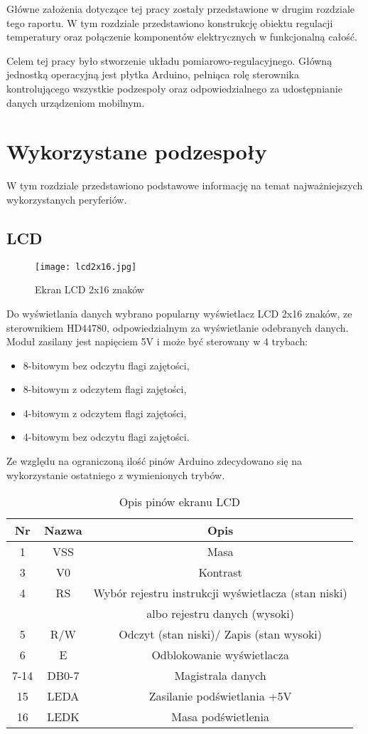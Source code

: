 Główne założenia dotyczące tej pracy zostały przedstawione w drugim rozdziale tego raportu. W tym rozdziale przedstawiono konstrukcję obiektu regulacji temperatury oraz połączenie komponentów elektrycznych w funkcjonalną całość.

Celem tej pracy było stworzenie układu pomiarowo-regulacyjnego. Główną jednostką operacyjną jest płytka Arduino, pełniąca rolę sterownika kontrolującego wszystkie podzespoły oraz odpowiedzialnego za udostępnianie danych urządzeniom mobilnym.


\section{Wykorzystane podzespoły} 
W tym rozdziale przedstawiono podstawowe informację na temat najważniejszych wykorzystanych peryferiów.
\subsection{LCD}%
\begin{figure}[H]
	\centering
	\texttt{[image: lcd2x16.jpg]}
	\caption{Ekran LCD 2x16 znaków}
\end{figure}
Do wyświetlania danych wybrano popularny wyświetlacz LCD 2x16 znaków, ze sterownikiem HD44780, odpowiedzialnym za wyświetlanie odebranych danych. Moduł zasilany jest napięciem 5V i może być sterowany w 4 trybach:
\begin{itemize}
\item 8-bitowym bez odczytu flagi zajętości,
\item 8-bitowym z odczytem flagi zajętości,
\item 4-bitowym z odczytem flagi zajętości,
\item 4-bitowym bez odczytu flagi zajętości.
\end{itemize}
Ze względu na ograniczoną ilość pinów Arduino zdecydowano się na wykorzystanie ostatniego z wymienionych trybów.

 \begin{table}[H]
	\centering
	\caption{Opis pinów ekranu LCD}
	\begin{tabular}{|c|c|c|}
		
  \hline 
  \bfseries Nr & \bfseries Nazwa & \bfseries Opis \\
  \hline
  1&VSS&Masa  \\
  \hline
  3&V0&Kontrast  \\
  \hline
  4&RS&Wybór rejestru instrukcji wyświetlacza (stan niski)\\
   &&albo rejestru danych (wysoki) \\
  \hline
  5&R/W& Odczyt (stan niski)/ Zapis (stan wysoki)  \\
  \hline
    6&E& Odblokowanie wyświetlacza  \\
  \hline
      7-14&DB0-7& Magistrala danych  \\
  \hline
        15&LEDA& Zasilanie podświetlania +5V  \\
  \hline
        16&LEDK& Masa podświetlenia  \\
  \hline
\end{tabular}
\end{table}

